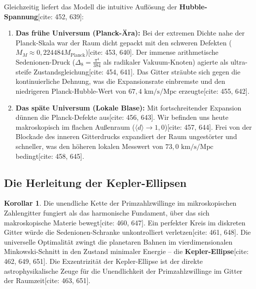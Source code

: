 \documentclass[11pt,a4paper]{article}
\newcommand{\Mplanck}{M_{\text{Planck}}}
\theoremstyle{definition}
\newtheorem{corollary}[theorem]{Korollar}
\begin{document}
	Gleichzeitig liefert das Modell die intuitive Auflösung der \textbf{Hubble-Spannung}[cite: 452, 639]:
	\begin{enumerate}
		\item \textbf{Das frühe Universum (Planck-Ära):} Bei der extremen Dichte nahe der Planck-Skala war der Raum dicht gepackt mit den schweren Defekten ($M_M \approx 0{,}224484 \Mplanck$)[cite: 453, 640]. Der immense arithmetische Sedenionen-Druck ($\Delta_8 = \frac{\pi^4}{384}$ als radikaler Vakuum-Knoten) agierte als ultra-steife Zustandsgleichung[cite: 454, 641]. Das Gitter sträubte sich gegen die kontinuierliche Dehnung, was die Expansionsrate einbremste und den niedrigeren Planck-Hubble-Wert von $67{,}4 \text{ km/s/Mpc} $ erzeugte[cite: 455, 642].
		\item \textbf{Das späte Universum (Lokale Blase):} Mit fortschreitender Expansion dünnen die Planck-Defekte aus[cite: 456, 643]. Wir befinden uns heute makroskopisch im flachen Außenraum ($\langle d \rangle \rightarrow 1{,}0$)[cite: 457, 644]. Frei von der Blockade des inneren Gitterdrucks expandiert der Raum ungestörter und schneller, was den höheren lokalen Messwert von $73{,}0 \text{ km/s/Mpc}$ bedingt[cite: 458, 645].
	\end{enumerate}
	
	\subsection{Die Herleitung der Kepler-Ellipsen}
	\begin{corollary}
		Die unendliche Kette der Primzahlzwillinge im mikroskopischen Zahlengitter fungiert als das harmonische Fundament, über das sich makroskopische Materie bewegt[cite: 460, 647]. Ein perfekter Kreis im diskreten Gitter würde die Sedenionen-Schranke unkontrolliert verletzen[cite: 461, 648]. Die universelle Optimalität zwingt die planetaren Bahnen im vierdimensionalen Minkowski-Schnitt in den Zustand minimaler Energie -- die \textbf{Kepler-Ellipse}[cite: 462, 649, 651]. Die Exzentrizität der Kepler-Ellipse ist der direkte astrophysikalische Zeuge für die Unendlichkeit der Primzahlzwillinge im Gitter der Raumzeit[cite: 463, 651].
	\end{corollary}
	
\end{document}
